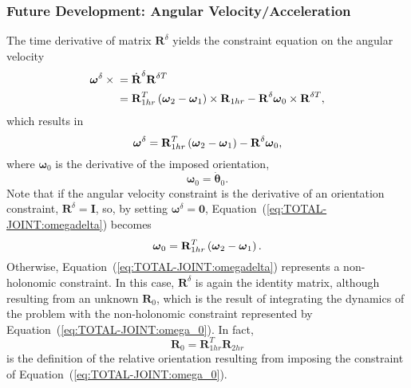 \documentclass[10pt,dvips,fleqn,subeqn]{report}
\newcommand{\T}[1]{\bm{\mathbf{#1}}}
\begin{document}
\subsubsection{Future Development: Angular Velocity/Acceleration}
The time derivative of matrix $\T{R}^{\delta}$ yields
the constraint equation on the angular velocity
\begin{align}
	\T{\omega}^{\delta}\times{}
	&= \dot{\T{R}}^{\delta} \T{R}^{\delta T} \nonumber \\
	&= \T{R}_{1hr}^T \plbr{
		\T{\omega}_2 - \T{\omega}_1
	} \times \T{R}_{1hr}
	- \T{R}^{\delta} \T{\omega}_0 \times \T{R}^{\delta T},
\end{align}
which results in
\begin{equation}
	\T{\omega}^{\delta} = \T{R}_{1hr}^T \plbr{
		\T{\omega}_2 - \T{\omega}_1
	} - \T{R}^{\delta} \T{\omega}_0 ,
	\label{eq:TOTAL-JOINT:omegadelta}
\end{equation}
where $\T{\omega}_0$ is the derivative of the imposed orientation,
\begin{equation}
	\T{\omega}_0 = \dot{\T{\theta}}_0 .
\end{equation}
Note that if the angular velocity constraint 
is the derivative of an orientation constraint, $\T{R}^{\delta}=\T{I}$,
so, by setting $\T{\omega}^{\delta}=\T{0}$,
Equation~(\ref{eq:TOTAL-JOINT:omegadelta}) becomes
\begin{equation}
	\T{\omega}_0 = \T{R}_{1hr}^T \plbr{
		\T{\omega}_2 - \T{\omega}_1
	} .
	\label{eq:TOTAL-JOINT:omega_0}
\end{equation}
Otherwise, Equation~(\ref{eq:TOTAL-JOINT:omegadelta}) represents
a non-holonomic constraint.
In this case, $\T{R}^{\delta}$ is again the identity matrix, although
resulting from an unknown $\T{R}_0$, which is the result of integrating
the dynamics of the problem with the non-holonomic constraint represented
by Equation~(\ref{eq:TOTAL-JOINT:omega_0}).
In fact,
\begin{equation}
	\T{R}_0 = \T{R}_{1hr}^T \T{R}_{2hr}
\end{equation}
is the definition of the relative orientation resulting from 
imposing the constraint of Equation~(\ref{eq:TOTAL-JOINT:omega_0}).
\end{document}
